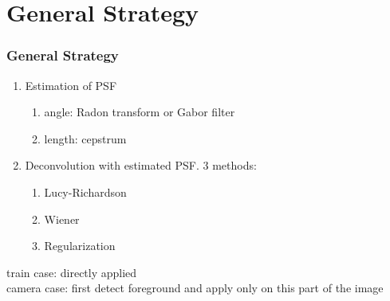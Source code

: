 \section[G. Strategy]{General Strategy}

\begin{frame}
	\frametitle{General Strategy}
	\begin{enumerate}
	\item Estimation of PSF
		\begin{enumerate}
		\item angle: Radon transform or Gabor filter
		\item length: cepstrum
		\end{enumerate}
	\item Deconvolution with estimated PSF. 3 methods:
		\begin{enumerate}
		\item Lucy-Richardson
		\item Wiener
		\item Regularization
		\end{enumerate}
	\end{enumerate}
	train case: directly applied\\
	camera case: first detect foreground and apply only on this part of the image
\end{frame}
